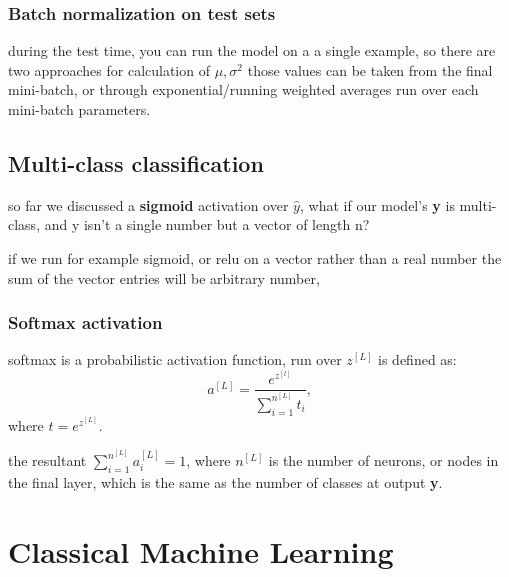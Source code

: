 \documentclass[4apaper,12pt]{book}
\begin{document}
\begin{description}
  \subsection{Batch normalization on test sets}
\item during the test time, you can run the model on a a single example, so there are two approaches for calculation of $\mu, \sigma^2$ those values can be taken from the final mini-batch, or through exponential/running weighted averages run over each mini-batch parameters.
  \end{description}

  \section{Multi-class classification}
  \begin{description}
  \item so far we discussed a \textbf{sigmoid} activation over \textbf{$\hat{y}$}, what if our model's \textbf{y} is multi-class, and y isn't a single number but a vector of length n?
    \item if we run for example sigmoid, or relu on a vector rather than a real number the sum of the vector entries will be arbitrary number,
    \subsection{Softmax activation}
  \item softmax is a probabilistic activation function, run over $z^{[L]}$ is defined as: $$
    a^{[L]}=\frac{e^{z^{[l]}}}{\sum_{i=1}^{n^{[L]}}t_i},$$  where $t=e^{z^{[L]}} $.
    \item the resultant $\sum_{i=1}^{n^{[L]}}{a_i^{[L]}}=1$, where $n^{[L]}$ is the number of neurons, or nodes in the final layer, which is the same as the number of classes at output \textbf{y}.
  \end{description}

  \chapter{Classical Machine Learning}
\end{document}
